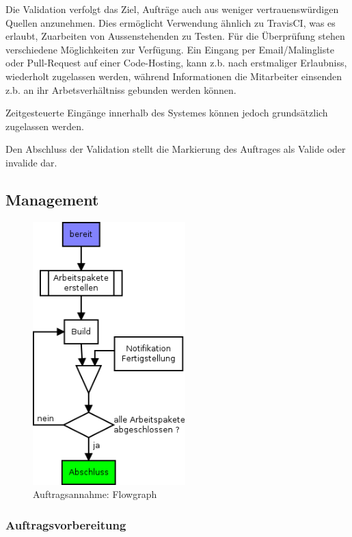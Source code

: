 Die Validation verfolgt das Ziel, Auftr\"age auch aus weniger vertrauensw\"urdigen Quellen anzunehmen.
Dies erm\"oglicht Verwendung \"ahnlich zu TravisCI, was es erlaubt, Zuarbeiten von Aussenstehenden zu Testen.
F\"ur die \"Uberpr\"ufung stehen verschiedene M\"oglichkeiten zur Verf\"ugung.
Ein Eingang per Email/Malingliste oder Pull-Request auf einer Code-Hosting,
kann z.b. nach erstmaliger Erlaubniss, wiederholt zugelassen werden,
w\"ahrend Informationen die Mitarbeiter einsenden z.b. an ihr Arbetsverh\"altniss gebunden werden k\"onnen.

Zeitgesteuerte Eing\"ange innerhalb des Systemes k\"onnen jedoch grunds\"atzlich zugelassen werden.

Den Abschluss der Validation stellt die Markierung des Auftrages als Valide oder invalide dar.

\subsection{Management}

\begin{figure}[ht] 
  \centering
  \label{fig:lebenszyklus-auftrag-abarbeitung}
  \includegraphics[height=4in]{imageinput/lebenszyklus-auftrag-abarbeitung.png}
  \caption{Auftragsannahme: Flowgraph}
\end{figure}

\subsubsection{Auftragsvorbereitung}

